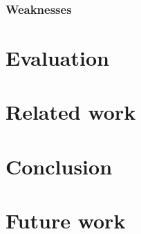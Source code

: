 \documentclass[10pt,a4paper,DIV=11]{scrreprt}
\begin{document}
\subsection{Weaknesses}

\chapter{Evaluation}
\chapter{Related work}
\chapter{Conclusion}
\chapter{Future work}





\newpage


\listoffigures
\listoftables
\listofalgorithms
\lstlistoflistings

\newpage




\end{document}
